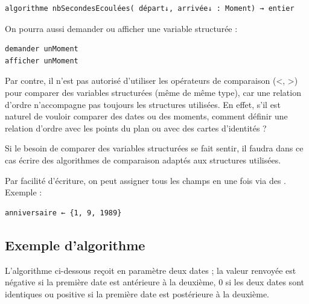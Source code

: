 \documentclass[11pt,a4paper]{article}
\begin{document}
            \par
        \begin{verbatim}
algorithme nbSecondesEcoulées( départ↓, arrivée↓ : Moment) → entier
      \end{verbatim}
		    On pourra aussi demander ou afficher une variable structur\'ee :
      
            \par
        \begin{verbatim}
demander unMoment
afficher unMoment
      \end{verbatim}
		    Par contre, il n'est pas autoris\'e d'utiliser les op\'erateurs de comparaison (<, >) pour comparer 
		    des variables structur\'ees (m\^eme de m\^eme type), car une relation d'ordre n'accompagne
        pas toujours les structures utilis\'ees. En effet, s'il est naturel de vouloir comparer des dates
        ou des moments, comment d\'efinir une relation d'ordre avec les points du plan ou avec des
        cartes d'identit\'es ?
      
            \par
        
        Si le besoin de comparer des variables structur\'ees se fait sentir, il faudra dans ce cas \'ecrire
        des algorithmes de comparaison adapt\'es aux structures utilis\'ees.
      
            \par
        
        Par facilit\'e d'\'ecriture, on peut assigner tous les champs en une fois via des \guillemotleft  {} \guillemotright . Exemple :
      
            \par
        \begin{verbatim}
anniversaire ← {1, 9, 1989}
      \end{verbatim}\subsection{Exemple d'algorithme}
		    L'algorithme ci-dessous re\c coit en param\`etre deux dates ; la valeur renvoy\'ee est n\'egative si la
        premi\`ere date est ant\'erieure \`a la deuxi\`eme, 0 si les deux dates sont identiques ou positive si
        la premi\`ere date est post\'erieure \`a la deuxi\`eme.
      
\end{document}
